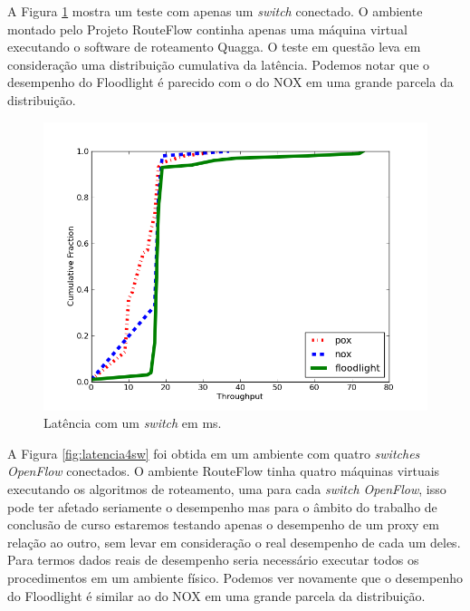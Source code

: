 A Figura \ref{fig:latencia1sw} mostra um teste com apenas
um \textit{switch} conectado. O ambiente montado pelo 
Projeto RouteFlow continha apenas uma máquina virtual
executando o software de roteamento Quagga. O teste em
questão leva em consideração uma distribuição cumulativa da
latência. Podemos notar que o desempenho do Floodlight é
parecido com o do NOX em uma grande parcela da distribuição.

\begin{figure}[h]
\centering
\includegraphics[width=140mm]{latencia_1sw.png}
\caption{Latência com um \textit{switch} em ms.}
\label{fig:latencia1sw} 
\end{figure}

A Figura \ref{fig:latencia4sw} foi obtida em um ambiente com
quatro \textit{switches} \textit{OpenFlow} conectados. O
ambiente RouteFlow tinha quatro máquinas virtuais executando
os algoritmos de roteamento, uma para cada \textit{switch OpenFlow},
isso pode ter afetado seriamente o desempenho mas para
o âmbito do trabalho de conclusão de curso estaremos 
testando apenas o desempenho de um proxy em relação ao
outro, sem levar em consideração o real desempenho de cada um
deles. Para termos dados reais de desempenho seria necessário
executar todos os procedimentos em um ambiente físico.
 Podemos ver
novamente que o desempenho do Floodlight é similar ao do
NOX em uma grande parcela da distribuição.

